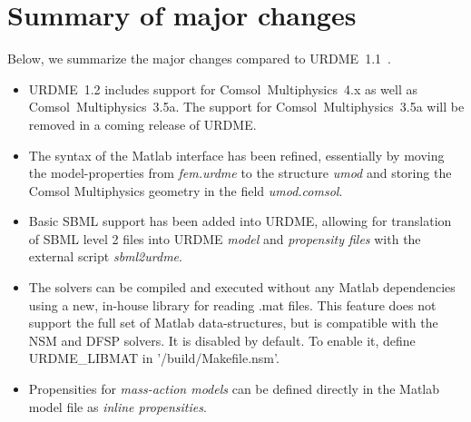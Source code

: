 \section{Summary of major changes}
\label{sec:changes}

Below, we summarize the major changes compared to
URDME~1.1~\cite{URDMEman2}.
\begin{itemize}
\item URDME~1.2 includes support for Comsol~Multiphysics~4.x as well
  as Comsol~Multiphysics~3.5a. The support for
  Comsol~Multiphysics~3.5a will be removed in a coming release of
  URDME.

\item The syntax of the Matlab interface has been refined, essentially
  by moving the model-properties from \textit{fem.urdme} to the
  structure \textit{umod} and storing the Comsol Multiphysics geometry
  in the field \textit{umod.comsol}.

\item Basic SBML support has been added into URDME, allowing for
  translation of SBML level 2 files into URDME \textit{model} and
  \textit{propensity files} with the external script
  \textit{sbml2urdme}.

\item The solvers can be compiled and executed without any Matlab dependencies using a new, in-house library for reading .mat files. This feature does not support the full set of Matlab data-structures, but is compatible with the NSM and DFSP solvers. It is disabled by default. To enable it, define URDME\_LIBMAT in '/build/Makefile.nsm'. 
\item Propensities for \emph{mass-action models} can be defined directly in the Matlab model file as \emph{inline propensities}. 

\end{itemize}
